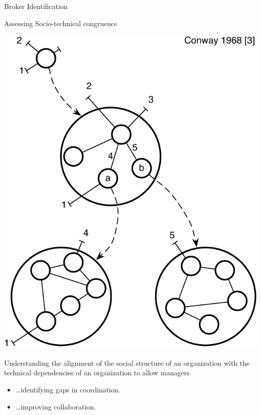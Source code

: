\documentclass[final]{beamer} %
\begin{document}
\begin{frame}{}
\begin{columns}[t]
\begin{column}{.45\linewidth}
\begin{block}{Broker Identification}
    \end{block}
    
        \vspace{2\columnsep}
    

    \begin{block}{Assessing Socio-technical congruence} 
    \begin{minipage}[c]{.4\linewidth}
    \includegraphics[width=\linewidth]{img/conway}
    \end{minipage}
        \hspace{\columnsep}
    \begin{minipage}[c]{.5\linewidth}
    Understanding the alignment of the social structure of an organization with the technical dependencies of an organization to allow managers
    
    \begin{itemize}
    \item \ldots identifying gaps in coordination.
    \item \ldots improving collaboration.
    \end{itemize}
    \end{minipage}
    \end{block}
    

\end{column}
\end{columns}
\end{frame}
\end{document}
